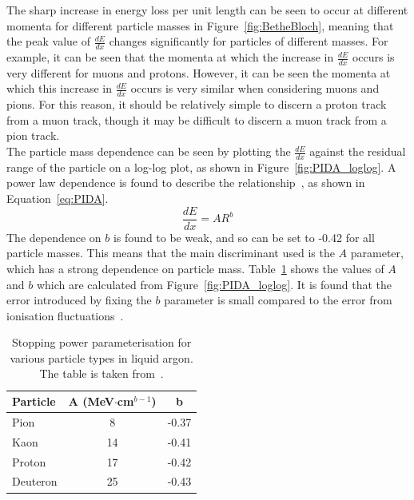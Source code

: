 The sharp increase in energy loss per unit length can be seen to occur at different momenta for different particle masses in Figure~\ref{fig:BetheBloch}, meaning that the peak value of $\frac{dE}{dx}$ changes significantly for particles of different masses. For example, it can be seen that the momenta at which the increase in $\frac{dE}{dx}$ occurs is very different for muons and protons. However, it can be seen the momenta at which this increase in $\frac{dE}{dx}$ occurs is very similar when considering muons and pions. For this reason, it should be relatively simple to discern a proton track from a muon track, though it may be difficult to discern a muon track from a pion track. \\

The particle mass dependence can be seen by plotting the $\frac{dE}{dx}$ against the residual range of the particle on a log-log plot, as shown in Figure~\ref{fig:PIDA_loglog}. A power law dependence is found to describe the relationship~\citep{PIDA_Paper}, as shown in Equation~\ref{eq:PIDA}.
\begin{equation}
  \label{eq:PIDA}
  \frac{dE}{dx} = A R^b
\end{equation}
The dependence on $b$ is found to be weak, and so can be set to -0.42 for all particle masses. This means that the main discriminant used is the $A$ parameter, which has a strong dependence on particle mass. Table~\ref{tab:PIDAVals} shows the values of $A$ and $b$ which are calculated from Figure~\ref{fig:PIDA_loglog}. It is found that the error introduced by fixing the $b$ parameter is small compared to the error from ionisation fluctuations~\citep{PIDA_Paper}. \\

\begin{table}
\caption[Stopping power parameterisation for various particle types in liquid argon]
        {Stopping power parameterisation for various particle types in liquid argon. The table is taken from~\citep{PIDA_Paper}.}
\centering
\label{tab:PIDAVals}
\begin{tabular}{l c c}
\toprule
{Particle} & {A (MeV$\cdot$cm$^{b-1}$)} & {b} \\ 
\midrule
Pion     & 8  & -0.37 \\

Kaon     & 14 & -0.41 \\

Proton   & 17 & -0.42 \\

Deuteron & 25 & -0.43 \\
\bottomrule
\end{tabular}
\end{table}

